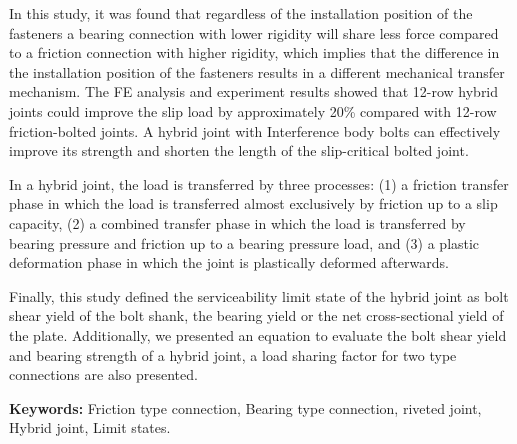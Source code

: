 
In this study, it was found that regardless of the installation position of the fasteners a bearing connection with lower rigidity will share less force compared to a friction connection with higher rigidity, which implies that the difference in the installation position of the fasteners results in a different mechanical transfer mechanism. The FE analysis and experiment results showed that 12-row hybrid joints could improve the slip load by approximately 20\% compared with 12-row friction-bolted joints. A hybrid joint with Interference body bolts can effectively improve its strength and shorten the length of the slip-critical bolted joint.

In a hybrid joint, the load is transferred by three processes: (1) a friction transfer phase in which the load is transferred almost exclusively by friction up to a slip capacity, (2) a combined transfer phase in which the load is transferred by bearing pressure and friction up to a bearing pressure load, and (3) a plastic deformation phase in which the joint is plastically deformed afterwards. 

Finally, this study defined the serviceability limit state of the hybrid joint as bolt shear yield of the bolt shank, the bearing yield or the net cross-sectional yield of the plate. Additionally, we presented an equation to evaluate the bolt shear yield and bearing strength of a hybrid joint, a load sharing factor for two type connections are also presented.


\textbf{Keywords:} Friction type connection, Bearing type connection, riveted joint, Hybrid joint, Limit states.